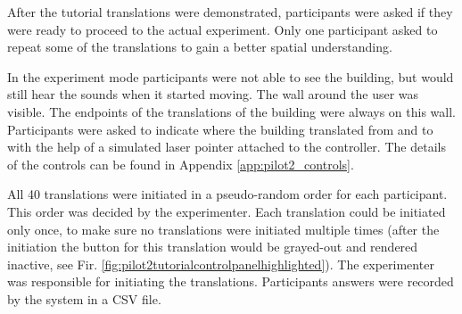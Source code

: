 After the tutorial translations were demonstrated, participants were asked if they were ready to proceed to the actual experiment. Only one participant asked to repeat some of the translations to gain a better spatial understanding.

In the experiment mode participants were not able to see the building, but would still hear the sounds when it started moving. The wall around the user was visible. The endpoints of the translations of the building were always on this wall. Participants were asked to indicate where the building translated from and to with the help of a simulated laser pointer attached to the controller. The details of the controls can be found in Appendix \ref{app:pilot2_controls}.

All 40 translations were initiated in a pseudo-random order for each participant. This order was decided by the experimenter. Each translation could be initiated only once, to make sure no translations were initiated multiple times (after the initiation the button for this translation would be grayed-out and rendered inactive, see Fir. \ref{fig:pilot2tutorialcontrolpanelhighlighted}). The experimenter was responsible for  initiating the translations.
Participants answers were recorded by the system in a CSV file.

